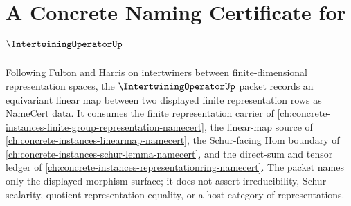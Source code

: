 \chapter{A Concrete Naming Certificate for $\IntertwiningOperatorUp$}
\label{ch:concrete-instances-intertwining-operator-namecert}

Following Fulton and Harris on intertwiners between finite-dimensional representation spaces, the $\IntertwiningOperatorUp$ packet records an equivariant linear map between two displayed finite representation rows as NameCert data. It consumes the finite representation carrier of \autoref{ch:concrete-instances-finite-group-representation-namecert}, the linear-map source of \autoref{ch:concrete-instances-linearmap-namecert}, the Schur-facing Hom boundary of \autoref{ch:concrete-instances-schur-lemma-namecert}, and the direct-sum and tensor ledger of \autoref{ch:concrete-instances-representationring-namecert}. The packet names only the displayed morphism surface; it does not assert irreducibility, Schur scalarity, quotient representation equality, or a host category of representations.

